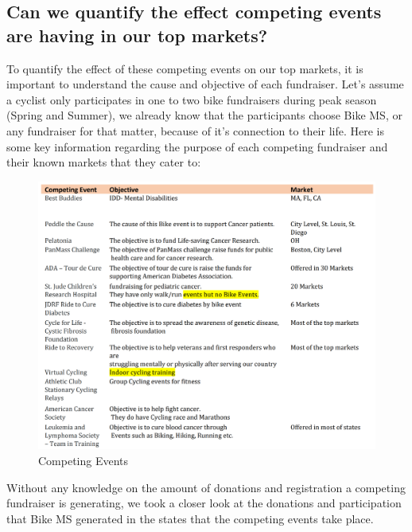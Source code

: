 \documentclass[]{article}
\begin{document}
\hypertarget{can-we-quantify-the-effect-competing-events-are-having-in-our-top-markets}{%
\subsection{Can we quantify the effect competing events are having in
our top
markets?}\label{can-we-quantify-the-effect-competing-events-are-having-in-our-top-markets}}

To quantify the effect of these competing events on our top markets, it
is important to understand the cause and objective of each fundraiser.
Let's assume a cyclist only participates in one to two bike fundraisers
during peak season (Spring and Summer), we already know that the
participants choose Bike MS, or any fundraiser for that matter, because
of it's connection to their life. Here is some key information regarding
the purpose of each competing fundraiser and their known markets that
they cater to:

\begin{figure}
\centering
\includegraphics{competingevents.png}
\caption{Competing Events}
\end{figure}

Without any knowledge on the amount of donations and registration a
competing fundraiser is generating, we took a closer look at the
donations and participation that Bike MS generated in the states that
the competing events take place.
\end{document}
